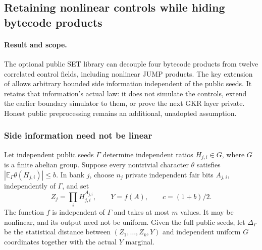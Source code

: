 \subsection{Retaining nonlinear controls while hiding bytecode products}\label{note:zk-public-seed-leakage}

\paragraph{Result and scope.} The optional public SET library can decouple four bytecode products from twelve correlated control fields, including nonlinear JUMP products. The key extension of  allows arbitrary bounded side information independent of the public seeds. It retains that information's actual law: it does not simulate the controls, extend the earlier boundary simulator to them, or prove the next GKR layer private. Honest public preprocessing remains an additional, unadopted assumption.

\subsubsection{Side information need not be linear}

Let independent public seeds $\Gamma$ determine independent ratios $H_{j,i}\in G$, where $G$ is a finite abelian group. Suppose every nontrivial character $\theta$ satisfies $|\mathbb E_\Gamma\theta(H_{j,i})|\le b$. In bank $j$, choose $n_j$ private independent fair bits $A_{j,i}$, independently of $\Gamma$, and set
\[
 Z_j=\prod_i H_{j,i}^{A_{j,i}},\qquad
 Y=f(A),\qquad c=(1+b)/2.
\]
The function $f$ is independent of $\Gamma$ and takes at most $m$ values. It may be nonlinear, and its output need not be uniform. Given the full public seeds, let $\Delta_\Gamma$ be the statistical distance between $(Z_1,\ldots,Z_k,Y)$ and independent uniform $G$ coordinates together with the actual $Y$ marginal.

